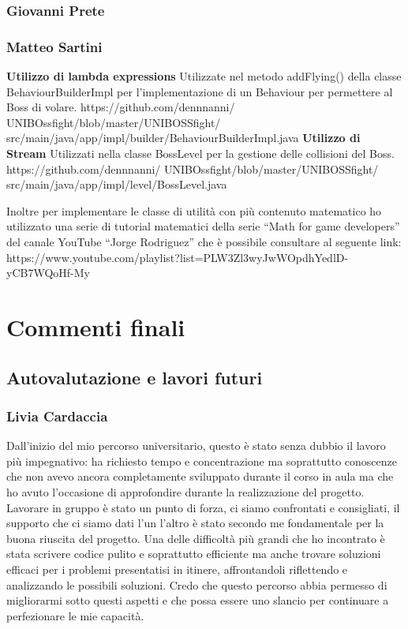 \documentclass{article}
\begin{document}
\subsubsection{Giovanni Prete}
\subsubsection{Matteo Sartini}
\textbf{Utilizzo di lambda expressions}
\newline
Utilizzate nel metodo addFlying() della classe BehaviourBuilderImpl per l'implementazione di un Behaviour per permettere al Boss di volare.
https://github.com/dennnanni/
UNIBOssfight/blob/master/UNIBOSSfight/
src/main/java/app/impl/builder/BehaviourBuilderImpl.java
\textbf{Utilizzo di Stream}
\newline
Utilizzati nella classe BossLevel per la gestione delle collisioni del Boss.
https://github.com/dennnanni/
UNIBOssfight/blob/master/UNIBOSSfight/
src/main/java/app/impl/level/BossLevel.java

Inoltre per implementare le classe di utilità con più contenuto matematico ho utilizzato una serie di tutorial matematici della serie “Math for game developers” del canale YouTube “Jorge Rodriguez” che è possibile consultare al seguente link:
https://www.youtube.com/playlist?list=PLW3Zl3wyJwWOpdhYedlD-yCB7WQoHf-My
\large
\section{Commenti finali}
\subsection{Autovalutazione e lavori futuri}
\subsubsection{Livia Cardaccia}
Dall'inizio del mio percorso universitario, questo è stato senza dubbio il lavoro più impegnativo: ha richiesto tempo e concentrazione ma soprattutto conoscenze che non avevo ancora completamente sviluppato durante il corso in aula ma che ho avuto l'occasione di approfondire durante la realizzazione del progetto. Lavorare in gruppo è stato un punto di forza, ci siamo confrontati e consigliati, il supporto che ci siamo dati l'un l'altro è stato secondo me fondamentale per la buona riuscita del progetto. Una delle difficoltà più grandi che ho incontrato è stata scrivere codice pulito e soprattutto efficiente ma anche trovare soluzioni efficaci per i problemi presentatisi in itinere, affrontandoli riflettendo e analizzando le possibili soluzioni. Credo che questo percorso abbia permesso di migliorarmi sotto questi aspetti e che possa essere uno slancio per continuare a perfezionare le mie capacità. 
\end{document}
